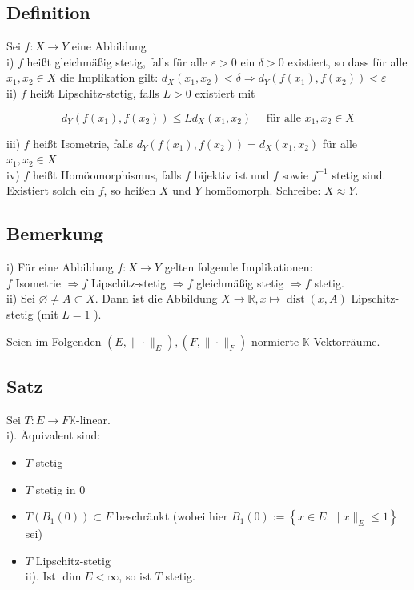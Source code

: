 \documentclass[10pt, letterpaper]{article}
\begin{document}
\subsection*{Definition}
Sei $f: X \rightarrow Y$ eine Abbildung\\
i) $f$ heißt gleichmäßig stetig, falls für alle $\varepsilon>0$ ein $\delta>0$ existiert, so dass für alle $x_{1}, x_{2} \in X$ die Implikation gilt: $d_{X}\left(x_{1}, x_{2}\right)<\delta \Longrightarrow d_{Y}\left(f\left(x_{1}\right), f\left(x_{2}\right)\right)<\varepsilon$\\
ii) $f$ heißt Lipschitz-stetig, falls $L>0$ existiert mit

$$
d_{Y}\left(f\left(x_{1}\right), f\left(x_{2}\right)\right) \leq L d_{X}\left(x_{1}, x_{2}\right) \quad \text { für alle } x_{1}, x_{2} \in X
$$

iii) $f$ heißt Isometrie, falls $d_{Y}\left(f\left(x_{1}\right), f\left(x_{2}\right)\right)=d_{X}\left(x_{1}, x_{2}\right)$ für alle $x_{1}, x_{2} \in X$\\
iv) $f$ heißt Homöomorphismus, falls $f$ bijektiv ist und $f$ sowie $f^{-1}$ stetig sind. Existiert solch ein $f$, so heißen $X$ und $Y$ homöomorph. Schreibe: $X \approx Y$.

\subsection*{Bemerkung}
i) Für eine Abbildung $f: X \rightarrow Y$ gelten folgende Implikationen:\\
$f$ Isometrie $\Longrightarrow f$ Lipschitz-stetig $\Longrightarrow f$ gleichmäßig stetig $\Longrightarrow f$ stetig.\\
ii) Sei $\varnothing \neq A \subset X$. Dann ist die Abbildung $X \rightarrow \mathbb{R}, x \mapsto \operatorname{dist}(x, A)$ Lipschitz-stetig (mit $L=1$ ).

Seien im Folgenden $\left(E,\|\cdot\|_{E}\right),\left(F,\|\cdot\|_{F}\right)$ normierte $\mathbb{K}$-Vektorräume.

\subsection*{Satz}
Sei $T: E \rightarrow F \mathbb{K}$-linear.\\
i). Äquivalent sind:

\begin{itemize}
  \item $T$ stetig
  \item $T$ stetig in 0
  \item $T\left(B_{1}(0)\right) \subset F$ beschränkt (wobei hier $B_{1}(0):=\left\{x \in E:\|x\|_{E} \leq 1\right\}$ sei)
  \item $T$ Lipschitz-stetig\\
ii). Ist $\operatorname{dim} E<\infty$, so ist $T$ stetig.
\end{itemize}
\end{document}

